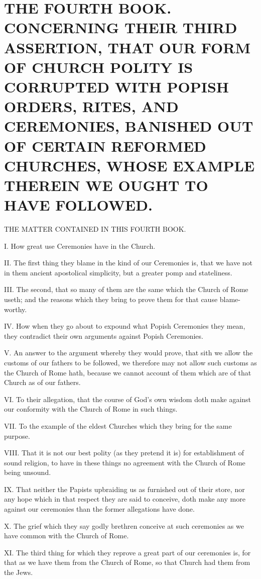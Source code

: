 \chapter*[The Fourth Book]{THE FOURTH BOOK. 
CONCERNING THEIR THIRD ASSERTION, THAT OUR FORM OF CHURCH POLITY IS CORRUPTED WITH POPISH ORDERS, RITES, AND CEREMONIES, BANISHED OUT OF CERTAIN REFORMED CHURCHES, WHOSE EXAMPLE THEREIN WE OUGHT TO HAVE FOLLOWED.}
\label{chap:book4}

THE MATTER CONTAINED IN THIS FOURTH BOOK.

I. How great use Ceremonies have in the Church.

II. The first thing they blame in the kind of our Ceremonies is, that we have not in them ancient apostolical simplicity, but a greater pomp and stateliness.

III. The second, that so many of them are the same which the Church of Rome useth; and the reasons which they bring to prove them for that cause blame-worthy.

IV. How when they go about to expound what Popish Ceremonies they mean, they contradict their own arguments against Popish Ceremonies.

V. An answer to the argument whereby they would prove, that sith we allow the customs of our fathers to be followed, we therefore may not allow such customs as the Church of Rome hath, because we cannot account of them which are of that Church as of our fathers.

VI. To their allegation, that the course of God’s own wisdom doth make against our conformity with the Church of Rome in such things.

VII. To the example of the eldest Churches which they bring for the same purpose.

VIII. That it is not our best polity (as they pretend it is) for establishment of sound religion, to have in these things no agreement with the Church of Rome being unsound.

IX. That neither the Papists upbraiding us as furnished out of their store, nor any hope which in that respect they are said to conceive, doth make any more against our ceremonies than the former allegations have done.

X. The grief which they say godly brethren conceive at such ceremonies as we have common with the Church of Rome.

XI. The third thing for which they reprove a great part of our ceremonies is, for that as we have them from the Church of Rome, so that Church had them from the Jews.

